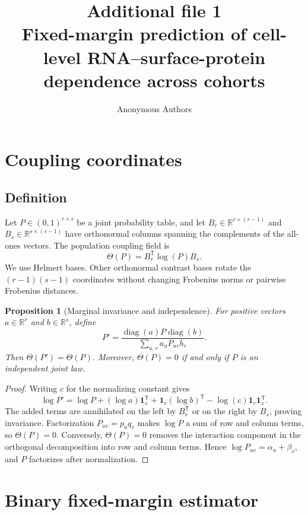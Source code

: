 \documentclass[10pt,a4paper]{article}
\title{Additional file 1\\[4pt]\large Fixed-margin prediction of cell-level RNA--surface-protein dependence across cohorts}
\author{Anonymous Authors}
\date{}
\newtheorem{proposition}{Proposition}
\newcommand{\field}{\Theta}
\newcommand{\R}{\mathbb{R}}
\begin{document}
\maketitle
\tableofcontents

\section{Coupling coordinates}

\subsection{Definition}

Let $P\in(0,1)^{r\times s}$ be a joint probability table, and let $B_r\in\R^{r\times(r-1)}$ and $B_s\in\R^{s\times(s-1)}$ have orthonormal columns spanning the complements of the all-ones vectors. The population coupling field is
\begin{equation}
  \field(P)=B_r^{\mathsf T}\log(P)B_s.
  \label{eq:s-field}
\end{equation}
We use Helmert bases. Other orthonormal contrast bases rotate the $(r-1)(s-1)$ coordinates without changing Frobenius norms or pairwise Frobenius distances.

\begin{proposition}[Marginal invariance and independence]
For positive vectors $a\in\R^r$ and $b\in\R^s$, define
\[
P'=\frac{\operatorname{diag}(a)P\operatorname{diag}(b)}
{\sum_{u,v}a_uP_{uv}b_v}.
\]
Then $\field(P')=\field(P)$. Moreover, $\field(P)=0$ if and only if $P$ is an independent joint law.
\end{proposition}

\begin{proof}
Writing $c$ for the normalizing constant gives
\[
\log P'=\log P+(\log a)\mathbf 1_s^{\mathsf T}
+\mathbf 1_r(\log b)^{\mathsf T}-\log(c)\mathbf 1_r\mathbf 1_s^{\mathsf T}.
\]
The added terms are annihilated on the left by $B_r^{\mathsf T}$ or on the right by $B_s$, proving invariance. Factorization $P_{uv}=p_uq_v$ makes $\log P$ a sum of row and column terms, so $\field(P)=0$. Conversely, $\field(P)=0$ removes the interaction component in the orthogonal decomposition into row and column terms. Hence $\log P_{uv}=\alpha_u+\beta_v$, and $P$ factorizes after normalization.
\end{proof}

\section{Binary fixed-margin estimator}
\end{document}
